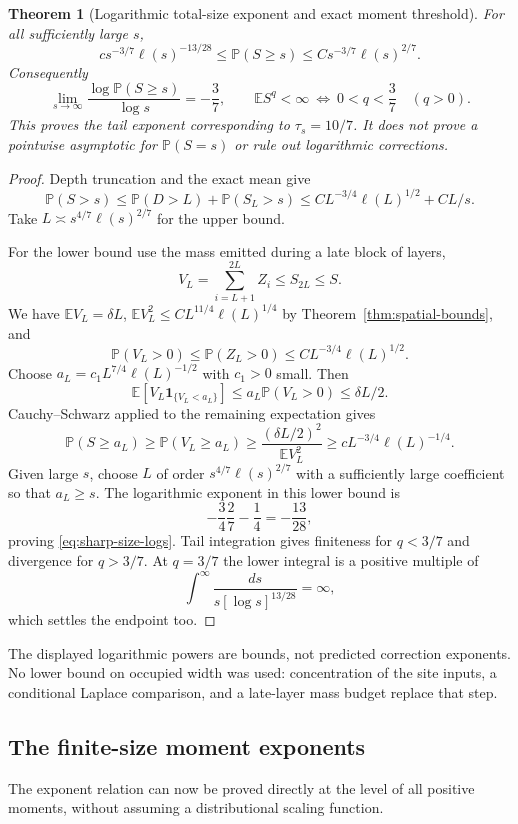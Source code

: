 \documentclass[11pt]{article}
\numberwithin{equation}{section}
\newtheorem{theorem}{Theorem}[section]
\theoremstyle{definition}
\newcommand{\E}{\mathbb E}
\newcommand{\Prob}{\mathbb P}
\newcommand{\ind}{\mathbf 1}
\begin{document}
\begin{theorem}[Logarithmic total-size exponent and exact moment threshold]\label{thm:size-exponent}
For all sufficiently large $s$,
\begin{equation}\label{eq:sharp-size-logs}
 c s^{-3/7}\ell(s)^{-13/28}
 \le\Prob(S\ge s)\le C s^{-3/7}\ell(s)^{2/7}.
\end{equation}
Consequently
\begin{equation}\label{eq:size-exponent}
 \lim_{s\to\infty}\frac{\log\Prob(S\ge s)}{\log s}=-\frac37,
 \qquad \E S^q<\infty\ \Longleftrightarrow\ 0<q<\frac37
 \quad(q>0).
\end{equation}
This proves the tail exponent corresponding to $\tau_s=10/7$. It does not prove a pointwise asymptotic for $\Prob(S=s)$ or rule out logarithmic corrections.
\end{theorem}
\begin{proof}
Depth truncation and the exact mean give
\[
 \Prob(S>s)\le\Prob(D>L)+\Prob(S_L>s)
 \le C L^{-3/4}\ell(L)^{1/2}+C L/s.
\]
Take $L\asymp s^{4/7}\ell(s)^{2/7}$ for the upper bound.

For the lower bound use the mass emitted during a late block of layers,
\[
 V_L=\sum_{i=L+1}^{2L}Z_i\le S_{2L}\le S.
\]
We have $\E V_L=\delta L$, $\E V_L^2\le C L^{11/4}\ell(L)^{1/4}$ by Theorem~\ref{thm:spatial-bounds}, and
\[
 \Prob(V_L>0)\le\Prob(Z_L>0)\le C L^{-3/4}\ell(L)^{1/2}.
\]
Choose $a_L=c_1L^{7/4}\ell(L)^{-1/2}$ with $c_1>0$ small. Then
\[
 \E[V_L\ind_{\{V_L<a_L\}}]\le a_L\Prob(V_L>0)\le\delta L/2.
\]
Cauchy--Schwarz applied to the remaining expectation gives
\[
 \Prob(S\ge a_L)\ge\Prob(V_L\ge a_L)
 \ge\frac{(\delta L/2)^2}{\E V_L^2}
 \ge c L^{-3/4}\ell(L)^{-1/4}.
\]
Given large $s$, choose $L$ of order $s^{4/7}\ell(s)^{2/7}$ with a sufficiently large coefficient so that $a_L\ge s$. The logarithmic exponent in this lower bound is
\[
 -\frac34\frac27-\frac14=-\frac{13}{28},
\]
proving \eqref{eq:sharp-size-logs}. Tail integration gives finiteness for $q<3/7$ and divergence for $q>3/7$. At $q=3/7$ the lower integral is a positive multiple of
\[
 \int^\infty\frac{ds}{s[\log s]^{13/28}}=\infty,
\]
which settles the endpoint too.
\end{proof}
The displayed logarithmic powers are bounds, not predicted correction exponents. No lower bound on occupied width was used: concentration of the site inputs, a conditional Laplace comparison, and a late-layer mass budget replace that step.

\subsection{The finite-size moment exponents}\label{sec:size-moment-spectrum}
The exponent relation can now be proved directly at the level of all positive moments, without assuming a distributional scaling function.
\end{document}
